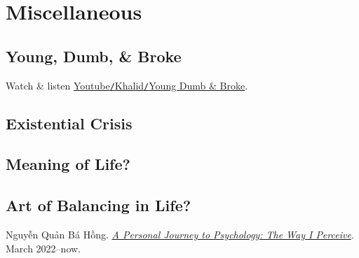 \documentclass[oneside]{book}
\numberwithin{equation}{section}
\begin{document}

\chapter{Miscellaneous}

\section{Young, Dumb, \& Broke}
Watch \& listen \href{https://www.youtube.com/watch?v=IPfJnp1guPc}{Youtube\texttt{/}Khalid\texttt{/}Young Dumb \& Broke}.

\section{Existential Crisis}

\section{Meaning of Life?}

\section{Art of Balancing in Life?}



\begin{thebibliography}{99}
	  Nguyễn Quản Bá Hồng. \href{https://github.com/NQBH/hobby/blob/master/psychology/NQBH_a_personal_journey_to_psychology.pdf}{\textit{A Personal Journey to Psychology: The Way I Perceive}}. March 2022--now.
\end{thebibliography}


\printbibliography[heading=bibintoc]
	
\end{document}
